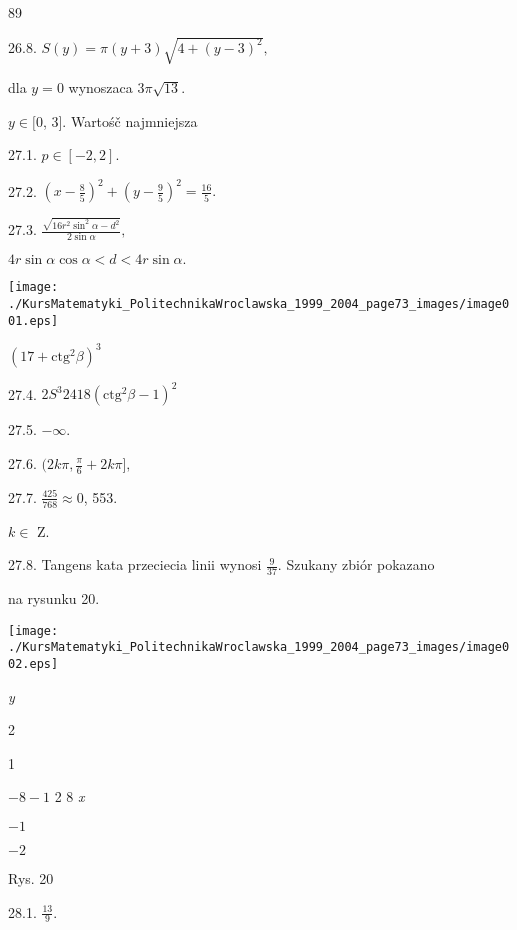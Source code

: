 \documentclass[a4paper,12pt]{article}
\begin{document}
89

26.8. $S(y)=\pi(y+3)\sqrt{4+(y-3)^{2}},$

dla $y=0$ wynoszaca $3\pi\sqrt{13}.$

$ y\in [0$, 3$]$. Wartośč najmniejsza

27.1. $p\in[-2,2].$

27.2. $(x-\displaystyle \frac{8}{5})^{2}+(y-\frac{9}{5})^{2}=\frac{16}{5}.$

27.3. $\displaystyle \frac{\sqrt{16r^{2}\sin^{2}\alpha-d^{2}}}{2\sin\alpha},$

$4r\sin\alpha\cos\alpha<d<4r\sin\alpha.$
\begin{center}
\texttt{[image: ./KursMatematyki\_PolitechnikaWroclawska\_1999\_2004\_page73\_images/image001.eps]}
\end{center}
$(17+\mathrm{c}\mathrm{t}\mathrm{g}^{2}\beta)^{3}$

27.4. $2S^{3}24 18(\mathrm{c}\mathrm{t}\mathrm{g}^{2}\beta-1)^{2}$

27.5. $-\infty.$

27.6. $(2k\displaystyle \pi,\frac{\pi}{6}+2k\pi],$

27.7. $\displaystyle \frac{425}{768}\approx 0$, 553.

$ k\in$ Z.

27.8. Tangens kata przeciecia linii wynosi $\displaystyle \frac{9}{37}$. Szukany zbiór pokazano

na rysunku 20.
\begin{center}
\texttt{[image: ./KursMatematyki\_PolitechnikaWroclawska\_1999\_2004\_page73\_images/image002.eps]}
\end{center}
{\it y}

2

1

$-8  -1$  2  8  {\it x}

$-1$

$-2$

Rys. 20

28.1. $\displaystyle \frac{13}{9}.$
\end{document}
